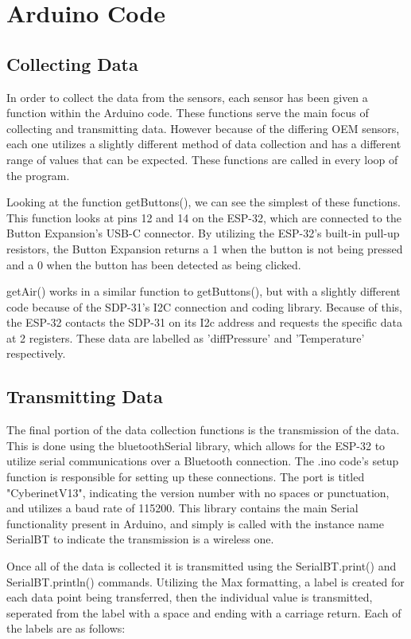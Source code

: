 \section{Arduino Code}


\subsection{Collecting Data}
In order to collect the data from the sensors, each sensor has been given a function within the Arduino code. These functions serve the main focus of collecting and transmitting data. However because of the differing OEM sensors, each one utilizes a slightly different method of data collection and has a different range of values that can be expected. These functions are called in every loop of the program.

Looking at the function getButtons(), we can see the simplest of these functions. This function looks at pins 12 and 14 on the ESP-32, which are connected to the Button Expansion's USB-C connector. By utilizing the ESP-32's built-in pull-up resistors, the Button Expansion returns a 1 when the button is not being pressed and a 0 when the button has been detected as being clicked.

getAir() works in a similar function to getButtons(), but with a slightly different code because of the SDP-31's I2C connection and coding library. Because of this, the ESP-32 contacts the SDP-31 on its I2c address and requests the specific data at 2 registers. These data are labelled as 'diffPressure' and 'Temperature' respectively. 

\subsection{Transmitting Data}
The final portion of the data collection functions is the transmission of the data. This is done using the bluetoothSerial library, which allows for the ESP-32 to utilize serial communications over a Bluetooth connection. The .ino code's setup function is responsible for setting up these connections. The port is titled "CyberinetV13", indicating the version number with no spaces or punctuation, and utilizes a baud rate of 115200. This library contains the main Serial functionality present in Arduino, and simply is called with the instance name SerialBT to indicate the transmission is a wireless one.

Once all of the data is collected it is transmitted using the SerialBT.print() and SerialBT.println() commands. Utilizing the Max formatting, a label is created for each data point being transferred, then the individual value is transmitted, seperated from the label with a space and ending with a carriage return. Each of the labels are as follows:


